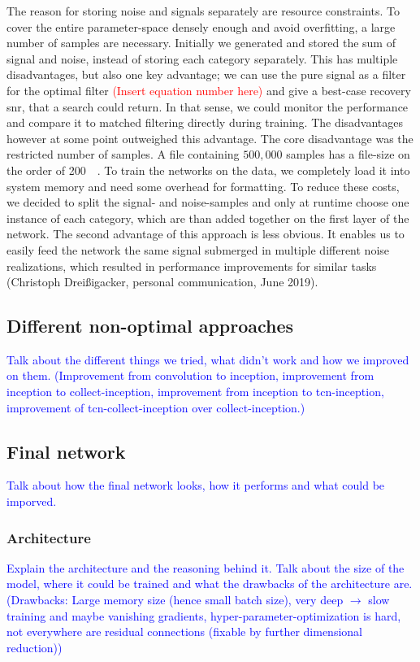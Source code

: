 The reason for storing noise and signals separately are resource constraints. To cover the entire parameter-space densely enough and avoid overfitting, a large number of samples are necessary. Initially we generated and stored the sum of signal and noise, instead of storing each category separately. This has multiple disadvantages, but also one key advantage; we can use the pure signal as a filter for the optimal filter \textcolor{red}{(Insert equation number here)} and give a best-case recovery \gls{snr}, that a search could return. In that sense, we could monitor the performance and compare it to matched filtering directly during training. The disadvantages however at some point outweighed this advantage. The core disadvantage was the restricted number of samples. A file containing $500,000$ samples has a file-size on the order of \SI{200}{\giga\byte}. To train the networks on the data, we completely load it into system memory and need some overhead for formatting. To reduce these costs, we decided to split the signal- and noise-samples and only at runtime choose one instance of each category, which are than added together on the first layer of the network. The second advantage of this approach is less obvious. It enables us to easily feed the network the same signal submerged in multiple different noise realizations, which resulted in performance improvements for similar tasks (Christoph Dreißigacker, personal communication, June 2019).

\subsection{Different non-optimal approaches}
\textcolor{blue}{Talk about the different things we tried, what didn't work and how we improved on them. (Improvement from convolution to inception, improvement from inception to collect-inception, improvement from inception to tcn-inception, improvement of tcn-collect-inception over collect-inception.)}
\subsection{Final network}
\textcolor{blue}{Talk about how the final network looks, how it performs and what could be imporved.}
\subsubsection{Architecture}
\textcolor{blue}{Explain the architecture and the reasoning behind it. Talk about the size of the model, where it could be trained and what the drawbacks of the architecture are. (Drawbacks: Large memory size (hence small batch size), very deep $\to$ slow training and maybe vanishing gradients, hyper-parameter-optimization is hard, not everywhere are residual connections (fixable by further dimensional reduction))}
